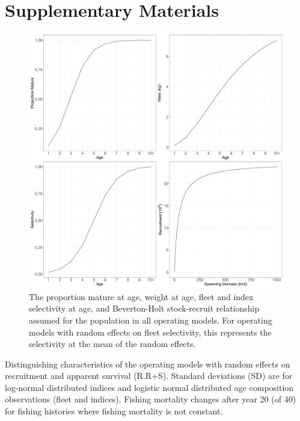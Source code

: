 \documentclass[
  12pt,
]{article}
\begin{document}
\pagebreak

\setcounter{figure}{0}
\renewcommand\thefigure{S\arabic{figure}}

\setcounter{table}{0}
\renewcommand\thetable{S\arabic{table}}

\hypertarget{supplementary-materials}{%
\section*{Supplementary Materials}\label{supplementary-materials}}

\begin{figure}[!ht]
\begin{center}
\includegraphics[width = \textwidth]{om_input_plots_figure}
\end{center}
\caption{The proportion mature at age, weight at age, fleet and index selectivity at age, and Beverton-Holt stock-recruit relationship assumed for the population in all operating models. For operating models with random effects on fleet selectivity, this represents the selectivity at the mean of the random effects.}\label{om_inputs_fig}
\end{figure}

\begin{landscape}
\begin{table}
\caption{Distinguishing characteristics of the operating models with random effects on recruitment and apparent survival (R.R+S). Standard deviations (SD) are for log-normal distributed indices and logistic normal distributed age composition observations (fleet and indices). Fishing mortality changes after year 20 (of 40) for fishing histories where fishing mortality is not constant.}\label{naa_om_table}
{\footnotesize }
\end{table}
\end{landscape}
\end{document}
